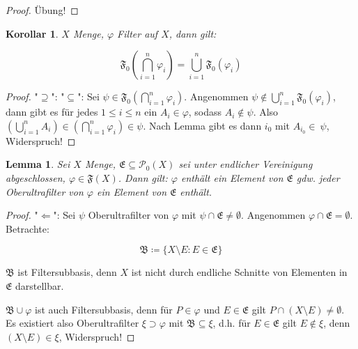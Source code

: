 \documentclass[12pt]{scrartcl}%
\newtheorem{korollar}{Korollar}
\newtheorem{lemma}{Lemma}
\theoremstyle{definition}
\theoremstyle{remark}
\newcommand{\powerset}{\mathcal{P}}
\newcommand{\filterset}{\mathfrak{F}}
\begin{document}
\begin{proof}
    Übung!
\end{proof}

\begin{korollar}
    $X$ Menge, $\varphi$ Filter auf $X$, dann gilt:

    \[ \filterset_0\left(\bigcap_{i=1}^n \varphi_i \right) = \bigcup_{i=1}^n \filterset_0(\varphi_i) \]
\end{korollar}

\begin{proof}
    "$\supseteq$": \checkmark
    "$\subseteq$": Sei $\psi\in\filterset_0\left(\bigcap_{i=1}^n \varphi_i \right)$. Angenommen $\psi\not\in \bigcup_{i=1}^n \filterset_0(\varphi_i)$, dann gibt es für jedes $1\leq i\leq n$ ein $A_i\in\varphi$, sodass $A_i\not\in\psi$. Also $\left( \bigcup_{i=1}^n A_i \right) \in \left( \bigcap_{i=1}^n \varphi_i \right) \in \psi$. Nach Lemma gibt es dann $i_0$ mit $A_{i_0}\in\ \psi$, Widerspruch!
\end{proof}

\begin{lemma}
    Sei $X$ Menge, $\mathfrak{E} \subseteq \powerset_0(X)$ sei unter endlicher Vereinigung abgeschlossen, $\varphi\in\filterset(X)$. Dann gilt: $\varphi$ enthält ein Element von $\mathfrak{E}$ gdw. jeder Oberultrafilter von $\varphi$ ein Element von $\mathfrak{E}$ enthält.
\end{lemma}

\begin{proof}
    "$\Leftarrow$": Sei $\psi$ Oberultrafilter von $\varphi$ mit $\psi \cap \mathfrak{E}\neq \emptyset$. Angenommen $\varphi \cap \mathfrak{E} = \emptyset$. Betrachte:

    \[ \mathfrak{B}\coloneqq \{ X\setminus E: E\in \mathfrak{E} \} \]

    $\mathfrak{B}$ ist Filtersubbasis, denn $X$ ist nicht durch endliche Schnitte von Elementen in $\mathfrak{E}$ darstellbar.

    $\mathfrak{B} \cup \varphi$ ist auch Filtersubbasis, denn für $P\in\varphi$ und $E\in\mathfrak{E}$ gilt $P\cap (X\setminus E) \neq \emptyset$. Es existiert also Oberultrafilter $\xi \supset \varphi$ mit $\mathfrak{B}\subseteq \xi$, d.h. für $E\in\mathfrak{E}$ gilt $E\not\in \xi$, denn $(X\setminus E)\in \xi$, Widerspruch!
\end{proof}
\end{document}
